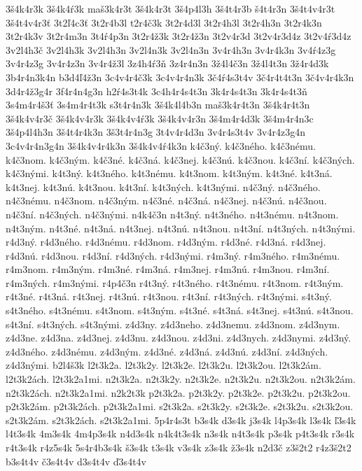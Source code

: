 {3š4k4r3k
3š4k4ŕ3k
maš3k4r3t
3š4k4r3t
3š4p4l3h
3š4t4r3b
š4t4r3n
3š4t4v4r3t
3š4t4v4r3ť
3t2ľ4c3ť
3t2r4b3l
t2r4č3k
3t2r4d3l
3t2r4h3l
3t2r4h3n
3t2r4k3n
3t2r4k3v
3t2r4m3n
3t4ŕ4p3n
3t2r4ž3k
3t2r4ž3n
3t2v4r3d
3t2v4r3d4z
3t2v4ŕ3d4z
3v2l4h3č
3v2l4h3k
3v2l4h3n
3v2l4n3k
3v2l4n3n
3v4r4h3n
3v4r4k3n
3v4ŕ4z3g
3v4r4z3g
3v4r4z3n
3v4r4ž3l
3z4h4ŕ3ň
3z4r4n3n
3ž4l4č3n
3ž4l4t3n
3ž4r4d3k
3b4r4n3k4n
b3d4ľ4ž3n
3c4v4r4č3k
3c4v4r4n3k
3č4ŕ4s3t4v
3č4r4t4t3n
3č4v4r4k3n
3d4r4ž3g4r
3f4r4n4g3n
h2ŕ4s3t4k
3c4h4r4s4t3n
3k4r4s4t3n
3k4r4s4t3ň
3s4m4r4š3ť
3s4m4r4t3k
s3t4r4n3k
3š4k4l4b3n
maš3k4r4t3n
3š4k4r4t3n
3š4k4v4r3č
3š4k4v4r3k
3š4k4v4ŕ3k
3š4k4v4r3n
3š4m4r4d3k
3š4m4r4n3c
3š4p4l4h3n
3š4t4r4k3n
3š3t4r4n3g
3t4v4r4d3n
3v4r4s3t4v
3v4r4z3g4n
3c4v4r4n3g4n
3š4k4v4r4k3n
3š4k4v4ŕ4k3n
k4č3ný.
k4č3ného.
k4č3nému.
k4č3nom.
k4č3ným.
k4č3né.
k4č3ná.
k4č3nej.
k4č3nú.
k4č3nou.
k4č3ní.
k4č3ných.
k4č3nými.
k4t3ný.
k4t3ného.
k4t3nému.
k4t3nom.
k4t3ným.
k4t3né.
k4t3ná.
k4t3nej.
k4t3nú.
k4t3nou.
k4t3ní.
k4t3ných.
k4t3nými.
n4č3ný.
n4č3ného.
n4č3nému.
n4č3nom.
n4č3ným.
n4č3né.
n4č3ná.
n4č3nej.
n4č3nú.
n4č3nou.
n4č3ní.
n4č3ných.
n4č3nými.
n4k4č3n
n4t3ný.
n4t3ného.
n4t3nému.
n4t3nom.
n4t3ným.
n4t3né.
n4t3ná.
n4t3nej.
n4t3nú.
n4t3nou.
n4t3ní.
n4t3ných.
n4t3nými.
r4d3ný.
r4d3ného.
r4d3nému.
r4d3nom.
r4d3ným.
r4d3né.
r4d3ná.
r4d3nej.
r4d3nú.
r4d3nou.
r4d3ní.
r4d3ných.
r4d3nými.
r4m3ný.
r4m3ného.
r4m3nému.
r4m3nom.
r4m3ným.
r4m3né.
r4m3ná.
r4m3nej.
r4m3nú.
r4m3nou.
r4m3ní.
r4m3ných.
r4m3nými.
r4p4č3n
r4t3ný.
r4t3ného.
r4t3nému.
r4t3nom.
r4t3ným.
r4t3né.
r4t3ná.
r4t3nej.
r4t3nú.
r4t3nou.
r4t3ní.
r4t3ných.
r4t3nými.
s4t3ný.
s4t3ného.
s4t3nému.
s4t3nom.
s4t3ným.
s4t3né.
s4t3ná.
s4t3nej.
s4t3nú.
s4t3nou.
s4t3ní.
s4t3ných.
s4t3nými.
z4d3ny.
z4d3neho.
z4d3nemu.
z4d3nom.
z4d3nym.
z4d3ne.
z4d3na.
z4d3nej.
z4d3nu.
z4d3nou.
z4d3ni.
z4d3nych.
z4d3nymi.
z4d3ný.
z4d3ného.
z4d3nému.
z4d3ným.
z4d3né.
z4d3ná.
z4d3nú.
z4d3ní.
z4d3ných.
z4d3nými.
b2l4š3k
l2t3k2a.
l2t3k2y.
l2t3k2e.
l2t3k2u.
l2t3k2ou.
l2t3k2ám.
l2t3k2ách.
l2t3k2a1mi.
n2t3k2a.
n2t3k2y.
n2t3k2e.
n2t3k2u.
n2t3k2ou.
n2t3k2ám.
n2t3k2ách.
n2t3k2a1mi.
n2k2t3k
p2t3k2a.
p2t3k2y.
p2t3k2e.
p2t3k2u.
p2t3k2ou.
p2t3k2ám.
p2t3k2ách.
p2t3k2a1mi.
s2t3k2a.
s2t3k2y.
s2t3k2e.
s2t3k2u.
s2t3k2ou.
s2t3k2ám.
s2t3k2ách.
s2t3k2a1mi.
5p4r4s3t
b3s4k
d3s4k
j3s4k
l4p3s4k
l3s4k
ľ3s4k
l4t3s4k
4m3s4k
4m4p3s4k
n4d3s4k
n4k4t3s4k
n3s4k
n4t3s4k
p3s4k
p4t3s4k
r3s4k
r4t3s4k
r4z5s4k
5s4r4b3s4k
š3s4k
t3s4k
v3s4k
z3s4k
ž3s4k
n2d3č
z3š2t2
r4z3š2t2
b3s4t4v
č3s4t4v
d3s4t4v
ď3s4t4v
}
